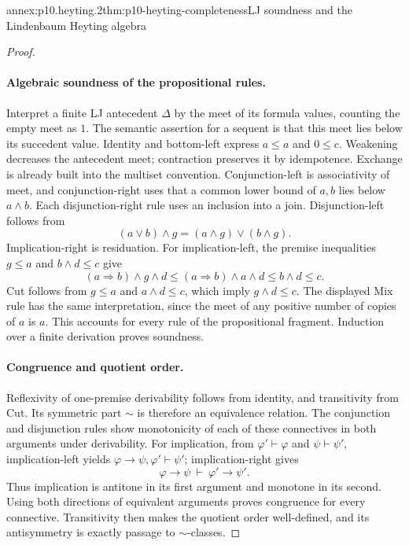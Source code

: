 \begin{annexitem}{annex:p10.heyting.2}{thm:p10-heyting-completeness}{LJ soundness and the Lindenbaum Heyting algebra}
\begin{proof}
\paragraph{Algebraic soundness of the propositional rules.}
Interpret a finite LJ antecedent \(\Delta\) by the meet of
its formula values, counting the empty meet as \(1\).
The semantic assertion for a sequent is that this meet lies
below its succedent value.
Identity and bottom-left express \(a\leq a\) and \(0\leq c\).
Weakening decreases the antecedent meet; contraction preserves
it by idempotence.  Exchange is already built into the
multiset convention.
Conjunction-left is associativity of meet, and conjunction-right
uses that a common lower bound of \(a,b\) lies below \(a\wedge b\).
Each disjunction-right rule uses an inclusion into a join.
Disjunction-left follows from
\[
 (a\vee b)\wedge g=(a\wedge g)\vee(b\wedge g).
\]
Implication-right is residuation.
For implication-left, the premise inequalities \(g\leq a\)
and \(b\wedge d\leq c\) give
\[
 (a\Rightarrow b)\wedge g\wedge d
       \leq(a\Rightarrow b)\wedge a\wedge d
       \leq b\wedge d\leq c.
\]
Cut follows from \(g\leq a\) and \(a\wedge d\leq c\),
which imply \(g\wedge d\leq c\).
The displayed Mix rule has the same interpretation, since
the meet of any positive number of copies of \(a\) is \(a\).
This accounts for every rule of the propositional fragment.
Induction over a finite derivation proves soundness.

\paragraph{Congruence and quotient order.}
Reflexivity of one-premise derivability follows from identity,
and transitivity from Cut.
Its symmetric part \(\sim\) is therefore an equivalence relation.
The conjunction and disjunction rules show monotonicity of
each of these connectives in both arguments under derivability.
For implication, from \(\varphi'\vdash\varphi\) and
\(\psi\vdash\psi'\), implication-left yields
\(\varphi\to\psi,\varphi'\vdash\psi'\);
implication-right gives
\[
 \varphi\to\psi\ \vdash\ \varphi'\to\psi'.
\]
Thus implication is antitone in its first argument and
monotone in its second.
Using both directions of equivalent arguments proves
congruence for every connective.
Transitivity then makes the quotient order well-defined,
and its antisymmetry is exactly passage to \(\sim\)-classes.


\end{proof}
\end{annexitem}
